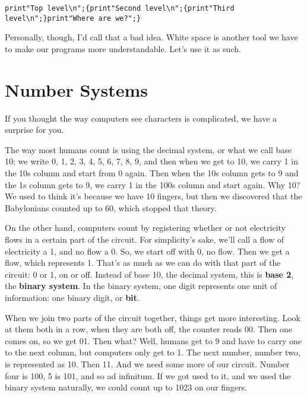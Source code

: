 \documentclass[a4paper,12pt,twoside]{book}
\begin{document}
\noindent 

\noindent \texttt{print"Top level\textbackslash n";\{print"Second level\textbackslash n";\{print"Third level\textbackslash n";\}print"Where are we?";\}}

\noindent 

\noindent Personally, though, I'd call that a bad idea. White space is another tool we have to make our programs more understandable. Let's use it as such.

\noindent 

\section{Number Systems}

\noindent 

\noindent If you thought the way computers see characters is complicated, we have a surprise for you.

\noindent 

\noindent The way most humans count is using the decimal system, or what we call base 10; we write 0, 1, 2, 3, 4, 5, 6, 7, 8, 9, and then when we get to 10, we carry 1 in the 10s column and start from 0 again. Then when the 10s column gets to 9 and the 1s column gets to 9, we carry 1 in the 100s column and start again. Why 10? We used to think it's because we have 10 fingers, but then we discovered that the Babylonians counted up to 60, which stopped that theory.

\noindent 

\noindent On the other hand, computers count by registering whether or not electricity flows in a certain part of the circuit. For simplicity's sake, we'll call a flow of electricity a 1, and no flow a 0. So, we start off with 0, no flow. Then we get a flow, which represents 1. That's as much as we can do with that part of the circuit: 0 or 1, on or off. Instead of base 10, the decimal system, this is \textbf{base 2}, the \textbf{binary system}. In the binary system, one digit represents one unit of information: one binary digit, or \textbf{bit}.

\noindent 

\noindent When we join two parts of the circuit together, things get more interesting. Look at them both in a row, when they are both off, the counter reads 00. Then one comes on, so we get 01. Then what? Well, humans get to 9 and have to carry one to the next column, but computers only get to 1. The next number, number two, is represented as 10. Then 11. And we need some more of our circuit. Number four is 100, 5 is 101, and so ad infinitum. If we got used to it, and we used the binary system naturally, we could count up to 1023 on our fingers.
\end{document}
